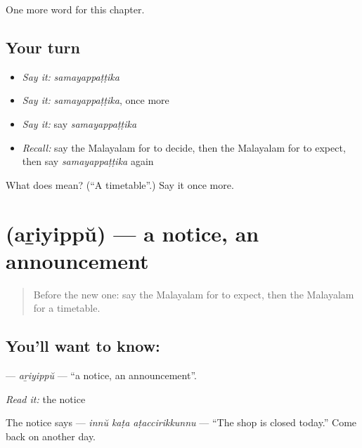 \begin{grammarlens}[title={What you've built}]
One more word for this chapter.
\end{grammarlens}

\subsection*{Your turn}
\begin{itemize}
\raggedright
  \item \emph{Say it:} \emph{samayappaṭṭika}
  \item \emph{Say it:} \emph{samayappaṭṭika}, once more
  \item \emph{Say it:} say \emph{samayappaṭṭika}
  \item \emph{Recall:} say the Malayalam for to decide, then the Malayalam for to expect, then say \emph{samayappaṭṭika} again
\end{itemize}

\begin{tcolorbox}[breakable,colback=teal!4,colframe=teal!35!black,title={Before you move on}]
What does  mean? (\textquotedblleft{}A timetable\textquotedblright{}.) Say it once more.
\end{tcolorbox}
\section[\texorpdfstring{\ml{അറിയിപ്പ്} (aṟiyippŭ)}{അറിയിപ്പ് (aṟiyippŭ)}]{ (aṟiyippŭ) — a notice, an announcement}

\label{lesson:ML-C180-ariyippu}



\begin{quote}
Before the new one: say the Malayalam for to expect, then the Malayalam for a timetable.
\end{quote}

\subsection*{You'll want to know: }
\textbf{} — \emph{aṟiyippŭ} — \textquotedblleft{}a notice, an announcement\textquotedblright{}.

\emph{Read it:} the notice

The notice says \textbf{  } — \emph{innŭ kaṭa aṭaccirikkunnu} — \textquotedblleft{}The shop is closed today.\textquotedblright{} Come back on another day.

